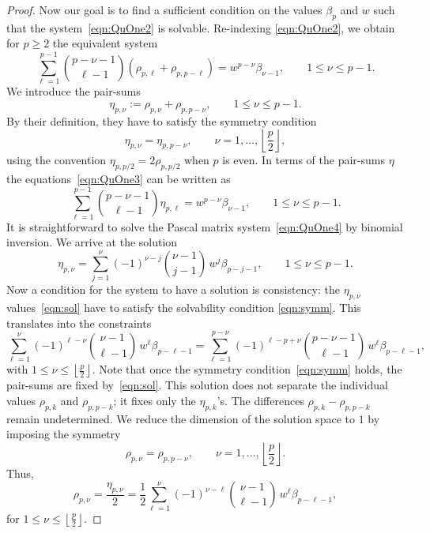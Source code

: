 \documentclass[10pt,reqno,a4paper]{amsart}%
\theoremstyle{definition}
\begin{document}
\begin{proof}
Now our goal is to find a sufficient condition on the values $\beta_{p}$ and
$w$ such that the system~\eqref{eqn:QuOne2} is solvable. Re-indexing
\eqref{eqn:QuOne2}, we obtain for $p\ge2$ the equivalent system
\begin{equation}
\sum_{\ell=1}^{p-1}\binom{p-\nu-1}{\ell-1} \left(  \rho_{p,\ell}%
+\rho_{p,p-\ell} \right)  = w^{p-\nu}\beta_{\nu-1}, \qquad1\le\nu\le p-1.
\label{eqn:QuOne3}%
\end{equation}
We introduce the pair-sums
\[
\eta_{p,\nu}:=\rho_{p,\nu}+\rho_{p,p-\nu}, \qquad1\le\nu\le p-1.
\]
By their definition, they have to satisfy the symmetry condition
\begin{equation}
\eta_{p,\nu}=\eta_{p,p-\nu}, \qquad\nu=1,\ldots,\left\lfloor \frac{p}%
{2}\right\rfloor , \label{eqn:symm}%
\end{equation}
using the convention $\eta_{p,p/2}=2\rho_{p,p/2}$ when $p$ is even. In terms
of the pair-sums $\eta$ the equations~\eqref{eqn:QuOne3} can be written as
\begin{equation}
\sum_{\ell=1}^{p-1}\binom{p-\nu-1}{\ell-1}\eta_{p,\ell} = w^{p-\nu}\beta
_{\nu-1}, \qquad1\le\nu\le p-1. \label{eqn:QuOne4}%
\end{equation}
It is straightforward to solve the Pascal matrix system~\eqref{eqn:QuOne4} by
binomial inversion. We arrive at the solution
\begin{equation}
\eta_{p,\nu} = \sum_{j=1}^{\nu} (-1)^{\nu-j}\binom{\nu-1}{j-1}\,w^{j}%
\beta_{p-j-1}, \qquad1\le\nu\le p-1. \label{eqn:sol}%
\end{equation}
Now a condition for the system to have a solution is consistency: the
$\eta_{p,\nu}$ values~\eqref{eqn:sol} have to satisfy the solvability
condition \eqref{eqn:symm}. This translates into the constraints
\[
\sum_{\ell=1}^{\nu} (-1)^{\ell-\nu}\binom{\nu-1}{\ell-1}\,w^{\ell}%
\beta_{p-\ell-1} = \sum_{\ell=1}^{p-\nu} (-1)^{\ell-p+\nu}\binom{p-\nu-1}%
{\ell-1}\,w^{\ell}\beta_{p-\ell-1}, 
\]
with $1\le\nu\le\left\lfloor \frac{p}{2}\right\rfloor$. Note that once the symmetry condition~\eqref{eqn:symm} holds, the pair-sums
are fixed by~\eqref{eqn:sol}. This solution does not separate the individual
values $\rho_{p,k}$ and $\rho_{p,p-k}$; it fixes only the $\eta_{p,k}$'s. The
differences $\rho_{p,k}-\rho_{p,p-k}$ remain undetermined. We reduce the
dimension of the solution space to $1$ by imposing the symmetry
\[
\rho_{p,\nu}=\rho_{p,p-\nu}, \qquad\nu=1,\ldots,\left\lfloor \frac{p}%
{2}\right\rfloor .
\]
Thus,
\[
\rho_{p,\nu} = \frac{\eta_{p,\nu}}{2} = \frac12 \sum_{\ell=1}^{\nu}
(-1)^{\nu-\ell}\binom{\nu-1}{\ell-1}\,w^{\ell}\beta_{p-\ell-1},
\]
for $1\le\nu\le\left\lfloor \frac{p}{2}\right\rfloor $.
\end{proof}
\end{document}
